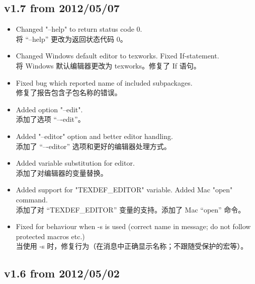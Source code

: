 \documentclass{article}
\begin{document}
\subsection*{v1.7 from 2012/05/07}
\begin{itemize}
 \item Changed "--help" to return status code 0.
 \\将 “–help” 更改为返回状态代码 0。
 \item Changed Windows default editor to texworks. Fixed If-statement.
 \\将 Windows 默认编辑器更改为 texworks。修复了 If 语句。
 \item Fixed bug which reported name of included subpackages.
 \\修复了报告包含子包名称的错误。
 \item Added option "--edit".
 \\添加了选项 “–-edit”。
 \item Added "--editor" option and better editor handling.
 \\添加了 “–-editor” 选项和更好的编辑器处理方式。
 \item Added variable substitution for editor.
 \\添加了对编辑器的变量替换。
 \item Added support for "TEXDEF\_EDITOR" variable. Added Mac "open" command.
 \\添加了对 “TEXDEF\_EDITOR” 变量的支持。添加了 Mac “open” 命令。
 \item Fixed for behaviour when -s is used (correct name in message; do not follow protected macros etc.)
 \\当使用 -s 时，修复行为（在消息中正确显示名称；不跟随受保护的宏等）。
\end{itemize}

\subsection*{v1.6 from 2012/05/02}
\end{document}
